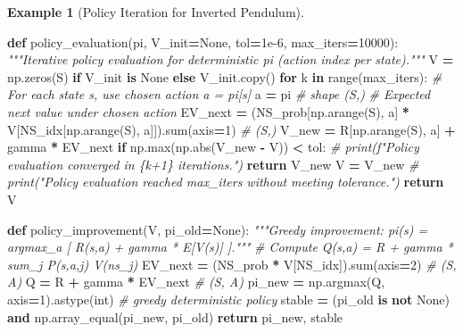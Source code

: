 \documentclass[
]{book}
\newenvironment{Shaded}{\begin{snugshade}}{\end{snugshade}}
\newcommand{\BuiltInTok}[1]{#1}
\newcommand{\CommentTok}[1]{\textcolor[rgb]{0.56,0.35,0.01}{\textit{#1}}}
\newcommand{\ControlFlowTok}[1]{\textcolor[rgb]{0.13,0.29,0.53}{\textbf{#1}}}
\newcommand{\DecValTok}[1]{\textcolor[rgb]{0.00,0.00,0.81}{#1}}
\newcommand{\FloatTok}[1]{\textcolor[rgb]{0.00,0.00,0.81}{#1}}
\newcommand{\KeywordTok}[1]{\textcolor[rgb]{0.13,0.29,0.53}{\textbf{#1}}}
\newcommand{\NormalTok}[1]{#1}
\newcommand{\OperatorTok}[1]{\textcolor[rgb]{0.81,0.36,0.00}{\textbf{#1}}}
\newcommand{\VariableTok}[1]{\textcolor[rgb]{0.00,0.00,0.00}{#1}}
\theoremstyle{definition}
\theoremstyle{definition}
\newtheorem{example}{Example}[chapter]
\theoremstyle{definition}
\theoremstyle{definition}
\theoremstyle{remark}
\begin{document}
\begin{example}[Policy Iteration for Inverted Pendulum]
\begin{Shaded}
\begin{Highlighting}[]
\KeywordTok{def}\NormalTok{ policy\_evaluation(pi, V\_init}\OperatorTok{=}\VariableTok{None}\NormalTok{, tol}\OperatorTok{=}\FloatTok{1e{-}6}\NormalTok{, max\_iters}\OperatorTok{=}\DecValTok{10000}\NormalTok{):}
    \CommentTok{"""Iterative policy evaluation for deterministic pi (action index per state)."""}
\NormalTok{    V }\OperatorTok{=}\NormalTok{ np.zeros(S) }\ControlFlowTok{if}\NormalTok{ V\_init }\KeywordTok{is} \VariableTok{None} \ControlFlowTok{else}\NormalTok{ V\_init.copy()}
    \ControlFlowTok{for}\NormalTok{ k }\KeywordTok{in} \BuiltInTok{range}\NormalTok{(max\_iters):}
        \CommentTok{\# For each state s, use chosen action a = pi[s]}
\NormalTok{        a }\OperatorTok{=}\NormalTok{ pi  }\CommentTok{\# shape (S,)}
        \CommentTok{\# Expected next value under chosen action}
\NormalTok{        EV\_next }\OperatorTok{=}\NormalTok{ (NS\_prob[np.arange(S), a] }\OperatorTok{*}\NormalTok{ V[NS\_idx[np.arange(S), a]]).}\BuiltInTok{sum}\NormalTok{(axis}\OperatorTok{=}\DecValTok{1}\NormalTok{)  }\CommentTok{\# (S,)}
\NormalTok{        V\_new }\OperatorTok{=}\NormalTok{ R[np.arange(S), a] }\OperatorTok{+}\NormalTok{ gamma }\OperatorTok{*}\NormalTok{ EV\_next}
        \ControlFlowTok{if}\NormalTok{ np.}\BuiltInTok{max}\NormalTok{(np.}\BuiltInTok{abs}\NormalTok{(V\_new }\OperatorTok{{-}}\NormalTok{ V)) }\OperatorTok{\textless{}}\NormalTok{ tol:}
            \CommentTok{\# print(f"Policy evaluation converged in \{k+1\} iterations.")}
            \ControlFlowTok{return}\NormalTok{ V\_new}
\NormalTok{        V }\OperatorTok{=}\NormalTok{ V\_new}
    \CommentTok{\# print("Policy evaluation reached max\_iters without meeting tolerance.")}
    \ControlFlowTok{return}\NormalTok{ V}

\KeywordTok{def}\NormalTok{ policy\_improvement(V, pi\_old}\OperatorTok{=}\VariableTok{None}\NormalTok{):}
    \CommentTok{"""Greedy improvement: pi\textquotesingle{}(s) = argmax\_a [ R(s,a) + gamma * E[V(s\textquotesingle{})] ]."""}
    \CommentTok{\# Compute Q(s,a) = R + gamma * sum\_j P(s,a,j) V(ns\_j)}
\NormalTok{    EV\_next }\OperatorTok{=}\NormalTok{ (NS\_prob }\OperatorTok{*}\NormalTok{ V[NS\_idx]).}\BuiltInTok{sum}\NormalTok{(axis}\OperatorTok{=}\DecValTok{2}\NormalTok{)      }\CommentTok{\# (S, A)}
\NormalTok{    Q }\OperatorTok{=}\NormalTok{ R }\OperatorTok{+}\NormalTok{ gamma }\OperatorTok{*}\NormalTok{ EV\_next                           }\CommentTok{\# (S, A)}
\NormalTok{    pi\_new }\OperatorTok{=}\NormalTok{ np.argmax(Q, axis}\OperatorTok{=}\DecValTok{1}\NormalTok{).astype(}\BuiltInTok{int}\NormalTok{)         }\CommentTok{\# greedy deterministic policy}
\NormalTok{    stable }\OperatorTok{=}\NormalTok{ (pi\_old }\KeywordTok{is} \KeywordTok{not} \VariableTok{None}\NormalTok{) }\KeywordTok{and}\NormalTok{ np.array\_equal(pi\_new, pi\_old)}
    \ControlFlowTok{return}\NormalTok{ pi\_new, stable}


\end{Highlighting}
\end{Shaded}
\end{example}
\end{document}

